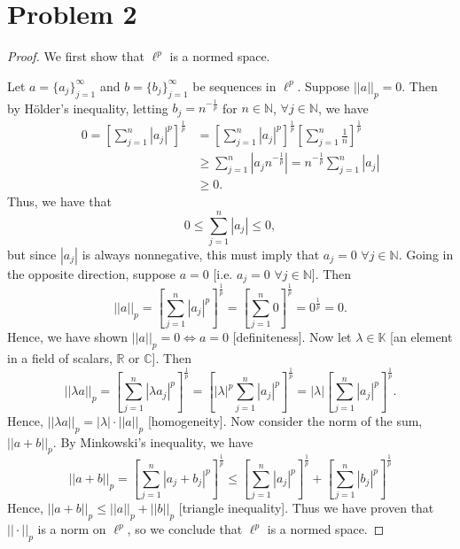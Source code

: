 \documentclass{article}
\begin{document}
\section*{Problem 2}
\begin{proof}
	We first show that $\ell^p$ is a normed space. 
	
	Let $a = \{a_j\}_{j=1}^{\infty}$ and $b = \{b_j\}_{j=1}^{\infty}$ be sequences in $\ell^p$. Suppose $||a||_p=0$. Then by Hölder's inequality, letting $b_j=n^{-\frac{1}{p}}$ for $n\in \mathbb{N}$, $\forall j\in\mathbb{N}$, we have
	\begin{align}
		0=\left[\sum_{j=1}^n|a_j|^p\right]^\frac{1}{p} &= \left[\sum_{j=1}^{n}|a_j|^p\right]^\frac{1}{p} \left[\sum_{j=1}^n \frac{1}{n}\right]^\frac{1}{p}\\
		&\geq \sum_{j=1}^n |a_j n^{-\frac{1}{p}}| = n^{-\frac{1}{p}}\sum_{j=1}^n |a_j| \\
		&\geq 0.
	\end{align}
	Thus, we have that
	\begin{equation}
		0\leq \sum_{j=1}^n |a_j| \leq 0,
	\end{equation}
	but since $|a_j|$ is always nonnegative, this must imply that $a_j=0$ $\forall j\in \mathbb{N}$. Going in the opposite direction, suppose $a=0$ [i.e. $a_j=0$ $\forall j\in \mathbb{N}$]. Then
	\begin{equation}
		||a||_p=\left[\sum_{j=1}^n |a_j|^p\right]^\frac{1}{p} = \left[\sum_{j=1}^n 0\right]^\frac{1}{p}=0^\frac{1}{p}=0. 
	\end{equation}
	Hence, we have shown $||a||_p = 0 \iff a = 0$ [definiteness]. Now let $\lambda\in\mathbb{K}$ [an element in a field of scalars, $\mathbb{R}$ or $\mathbb{C}$]. Then
	\begin{equation}
		||\lambda a||_p = \left[\sum_{j=1}^n |\lambda a_j|^p\right]^\frac{1}{p}=\left[|\lambda|^p \sum_{j=1}^n |a_j|^p\right]^\frac{1}{p} = |\lambda|\left[\sum_{j=1}^n |a_j|^p\right]^\frac{1}{p}.
	\end{equation}
	Hence, $||\lambda a||_p = |\lambda|\cdot||a||_p$ [homogeneity]. Now consider the norm of the sum, $||a+b||_p$. By Minkowski's inequality, we have
	\begin{equation}
		||a+b||_p = \left[\sum_{j=1}^n |a_j +b_j|^p\right]^\frac{1}{p}\leq \left[\sum_{j=1}^n |a_j|^p\right]^\frac{1}{p} + \left[\sum_{j=1}^n |b_j|^p\right]^\frac{1}{p}
	\end{equation}
	Hence, $||a+b||_p \leq ||a||_p + ||b||_p$ [triangle inequality]. Thus we have proven that $||\cdot||_p$ is a norm on $\ell^p$, so we conclude that $\ell^p$ is a normed space. 
	

\end{proof}
\end{document}
